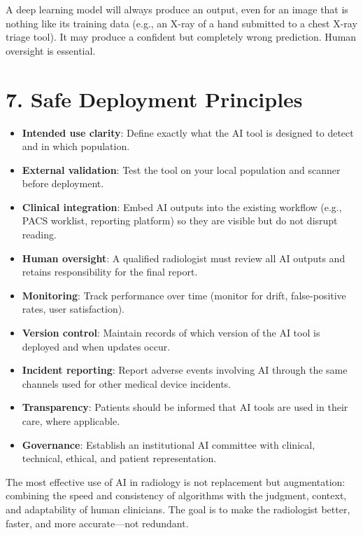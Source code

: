 \begin{pearlbox}
A deep learning model will always produce an output, even for an image that is nothing like its training data (e.g., an X-ray of a hand submitted to a chest X-ray triage tool). It may produce a confident but completely wrong prediction. Human oversight is essential.
\end{pearlbox}


\section*{7. Safe Deployment Principles}

\begin{testbox}
\begin{itemize}
    \item \textbf{Intended use clarity}: Define exactly what the AI tool is designed to detect and in which population.
    \item \textbf{External validation}: Test the tool on your local population and scanner before deployment.
    \item \textbf{Clinical integration}: Embed AI outputs into the existing workflow (e.g., PACS worklist, reporting platform) so they are visible but do not disrupt reading.
    \item \textbf{Human oversight}: A qualified radiologist must review all AI outputs and retains responsibility for the final report.
    \item \textbf{Monitoring}: Track performance over time (monitor for drift, false-positive rates, user satisfaction).
    \item \textbf{Version control}: Maintain records of which version of the AI tool is deployed and when updates occur.
    \item \textbf{Incident reporting}: Report adverse events involving AI through the same channels used for other medical device incidents.
    \item \textbf{Transparency}: Patients should be informed that AI tools are used in their care, where applicable.
    \item \textbf{Governance}: Establish an institutional AI committee with clinical, technical, ethical, and patient representation.
\end{itemize}
\end{testbox}

\begin{pearlbox}
The most effective use of AI in radiology is not replacement but augmentation: combining the speed and consistency of algorithms with the judgment, context, and adaptability of human clinicians. The goal is to make the radiologist better, faster, and more accurate---not redundant.
\end{pearlbox}

\clearpage
